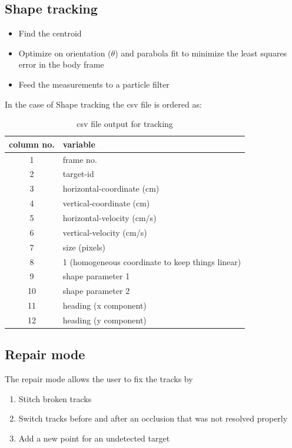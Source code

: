 \documentclass[12pt]{article}
\begin{document}
\subsection{Shape tracking}
\begin{itemize}
\item Find the centroid
\item Optimize on orientation ($\theta$) and parabola fit to minimize the least squares error in the body frame
\item Feed the measurements to a particle filter
\end{itemize}
In the case of Shape tracking the csv file is ordered as:
\begin{table}[t]
\caption{csv file output for  tracking}
\begin{center}
\begin{tabular}[t]{cl}
\hline
column no. &  variable \\
\hline
1 & frame  no. \\
2 & target-id \\
3 &  horizontal-coordinate (cm) \\
4 & vertical-coordinate (cm) \\
5 &  horizontal-velocity (cm/s) \\
6 &  vertical-velocity (cm/s) \\
7 &  size (pixels) \\
8& 1 (homogeneous coordinate to keep things linear) \\
9  &shape parameter 1\\
10 &  shape parameter 2\\
11 &  heading (x component) \\
12 &  heading (y component) \\
\end{tabular}
\end{center}
\label{tab:params}
\end{table}


\subsection{Repair mode}
The repair mode allows the user to fix the tracks by
\begin{enumerate}
\item Stitch broken tracks
\item Switch tracks before and after an occlusion that was not resolved properly
\item Add a new point for an undetected target
\end{enumerate}
\end{document}
